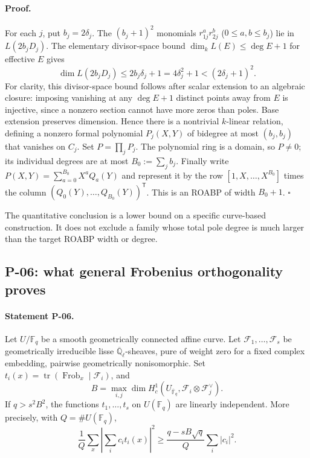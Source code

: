 \documentclass[11pt,a4paper]{article}
\theoremstyle{definition}\newtheorem{definition}{Definition}
\begin{document}
\paragraph{Proof.}
For each $j$, put $b_j=2\delta_j$. The $(b_j+1)^2$ monomials $r_{1j}^a r_{2j}^b$ ($0\le a,b\le b_j$) lie in $L(2b_jD_j)$. The elementary divisor-space bound $\dim_k L(E)\le\deg E+1$ for effective $E$ gives
\[
 \dim L(2b_jD_j)\le2b_j\delta_j+1=4\delta_j^2+1<(2\delta_j+1)^2.
\]
For clarity, this divisor-space bound follows after scalar extension to an algebraic closure: imposing vanishing at any $\deg E+1$ distinct points away from $E$ is injective, since a nonzero section cannot have more zeros than poles. Base extension preserves dimension. Hence there is a nontrivial $k$-linear relation, defining a nonzero formal polynomial $P_j(X,Y)$ of bidegree at most $(b_j,b_j)$ that vanishes on $C_j$. Set $P=\prod_jP_j$. The polynomial ring is a domain, so $P\ne0$; its individual degrees are at most $B_0:=\sum_jb_j$. Finally write $P(X,Y)=\sum_{a=0}^{B_0}X^a Q_a(Y)$ and represent it by the row $[1,X,\ldots,X^{B_0}]$ times the column $(Q_0(Y),\ldots,Q_{B_0}(Y))^{\mathsf T}$. This is an ROABP of width $B_0+1$. $\square$

The quantitative conclusion is a lower bound on a specific curve-based construction. It does not exclude a family whose total pole degree is much larger than the target ROABP width or degree.

\subsection{P-06: what general Frobenius orthogonality proves}
\paragraph{Statement P-06.}
Let $U/\mathbb F_q$ be a smooth geometrically connected affine curve. Let $\mathcal F_1,\ldots,\mathcal F_s$ be geometrically irreducible lisse $\overline{\mathbb Q}_\ell$-sheaves, pure of weight zero for a fixed complex embedding, pairwise geometrically nonisomorphic. Set $t_i(x)=\operatorname{tr}(\operatorname{Frob}_x\mid\mathcal F_i)$, and
\[
 B=\max_{i,j}\dim H_c^1(U_{\overline{\mathbb F}_q},\mathcal F_i\otimes\mathcal F_j^\vee).
\]
If $q>s^2B^2$, the functions $t_1,\ldots,t_s$ on $U(\mathbb F_q)$ are linearly independent. More precisely, with $Q=\#U(\mathbb F_q)$,
\[
 \frac1Q\sum_x\left|\sum_i c_it_i(x)\right|^2
 \ge\frac{q-sB\sqrt q}{Q}\sum_i|c_i|^2.
\]
\end{document}
